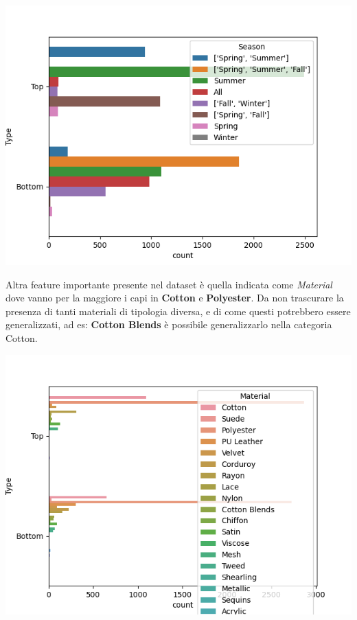 \documentclass[a4paper, 11pt, oneside]{report}
\begin{document}
                \begin{center}
                    \includegraphics[scale=0.4]{countSeasonTopBottom}
                \end{center}
                \newpage
                \par \noindent Altra feature importante presente nel dataset è quella indicata come \textit{Material}
                dove vanno per la maggiore i capi in \textbf{Cotton} e \textbf{Polyester}. Da non trascurare la presenza
                di tanti materiali di tipologia diversa, e di come questi potrebbero essere generalizzati, ad es: \textbf{Cotton Blends}
                è possibile generalizzarlo nella categoria Cotton.
                \begin{center}
                    \includegraphics[scale=0.4]{countMaterialTopBottom}
                \end{center}
\end{document}

